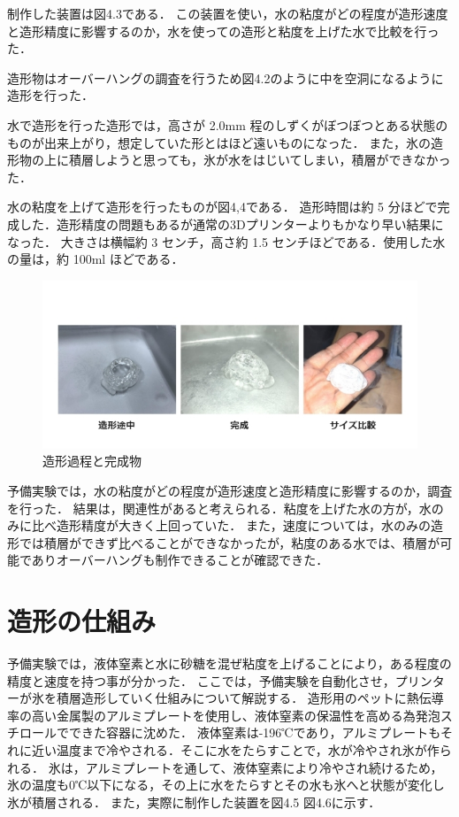 制作した装置は図4.3である．
この装置を使い，水の粘度がどの程度が造形速度と造形精度に影響するのか，水を使っての造形と粘度を上げた水で比較を行った．

造形物はオーバーハングの調査を行うため図4.2のように中を空洞になるように造形を行った． 

水で造形を行った造形では，高さが 2.0mm  程のしずくがぼつぼつとある状態のものが出来上がり，想定していた形とはほど遠いものになった．
また，氷の造形物の上に積層しようと思っても，氷が水をはじいてしまい，積層ができなかった．

水の粘度を上げて造形を行ったものが図4,4である．
造形時間は約 5 分ほどで完成した．造形精度の問題もあるが通常の3Dプリンターよりもかなり早い結果になった．
大きさは横幅約 3 センチ，高さ約 1.5 センチほどである．使用した水の量は，約 100ml ほどである．

\begin{figure}[H]
  \centering
  \includegraphics[width=15truecm]{./fig/yobi.jpg}
  \caption{造形過程と完成物}
  \label{fig:yobikekka}
\end{figure}

予備実験では，水の粘度がどの程度が造形速度と造形精度に影響するのか，調査を行った．
結果は，関連性があると考えられる．粘度を上げた水の方が，水のみに比べ造形精度が大きく上回っていた．
また，速度については，水のみの造形では積層ができず比べることができなかったが，粘度のある水では、積層が可能でありオーバーハングも制作できることが確認できた．

\section{造形の仕組み}
\label{sec:paragraph}
予備実験では，液体窒素と水に砂糖を混ぜ粘度を上げることにより，ある程度の精度と速度を持つ事が分かった．
ここでは，予備実験を自動化させ，プリンターが氷を積層造形していく仕組みについて解説する．
造形用のペットに熱伝導率の高い金属製のアルミプレートを使用し、液体窒素の保温性を高める為発泡スチロールでできた容器に沈めた．
液体窒素は-196℃であり，アルミプレートもそれに近い温度まで冷やされる．そこに水をたらすことで，水が冷やされ氷が作られる．
氷は，アルミプレートを通して、液体窒素により冷やされ続けるため，氷の温度も0℃以下になる，その上に水をたらすとその水も氷へと状態が変化し氷が積層される．
また，実際に制作した装置を図4.5 図4.6に示す．

